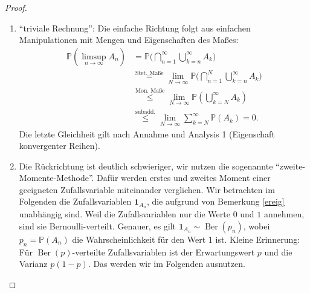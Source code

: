 \begin{proof}\abs
	\begin{enumerate}[label=(\roman*)]
		\item \enquote{triviale Rechnung}: Die einfache Richtung folgt aus einfachen Manipulationen mit Mengen und Eigenschaften des Ma\ss es:
		\begin{align*}
			\mathbb{P}(\limsup\limits_{n \to \infty} A_n) 
			&= \mathbb{P}\Big(\bigcap_{n=1}^{\infty} \bigcup_{k=n}^{\infty} A_k\Big)\\
			&\overset{\text{Stet. Ma\ss e}}{=} \lim\limits_{N \to \infty} \mathbb{P}\Big(\bigcap_{n=1}^{N} \bigcup_{k=n}^{\infty} A_k\Big)\\
			&\overset{\text{Mon. Ma\ss e}}{\leq} \lim\limits_{N \to \infty} \mathbb{P}(\bigcup_{k=N}^{\infty} A_k) \\
			&\overset{\text{subadd.}}{\leq} \lim\limits_{N \to \infty} \sum\limits_{k=N}^{\infty} \mathbb{P}(A_k) = 0.
		\end{align*}
		Die letzte Gleichheit gilt nach Annahme und Analysis 1 (Eigenschaft konvergenter Reihen).
		\item Die R\"uckrichtung ist deutlich schwieriger, wir nutzen die sogenannte \enquote{zweite-Momente-Methode}. Daf\"ur werden erstes und zweites Moment einer geeigneten Zufallsvariable miteinander verglichen. Wir betrachten im Folgenden die Zufallsvariablen $\mathbf 1_{A_n}$, die aufgrund von Bemerkung \ref{ereig} unabh\"angig sind. Weil die Zufallsvariablen nur die Werte $0$ und $1$ annehmen, sind sie Bernoulli-verteilt. Genauer, es gilt $\mathbf 1_{A_n}\sim \operatorname{Ber}(p_n)$, wobei $p_n=\mathbb P(A_n)$ die Wahrscheinlichkeit f\"ur den Wert $1$ ist. Kleine Erinnerung: F\"ur $\operatorname{Ber}(p)$-verteilte Zufallsvariablen ist der Erwartungswert $p$ und die Varianz $p(1-p)$. Das werden wir im Folgenden ausnutzen.\smallskip
		

\end{enumerate}
\end{proof}
